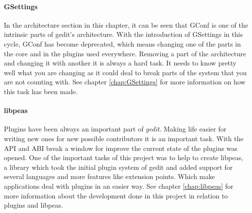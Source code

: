 \paragraph{GSettings}

In the architecture section in this chapter, it can be seen that GConf is one 
of the intrinsic parts of gedit's architecture. With the introduction of GSettings 
in this cycle, GConf has become deprecated, which means changing one of the parts 
in the core and in the plugins used everywhere. Removing a part of the architecture 
and changing it with another it is always a hard task. It needs to know pretty well 
what you are changing as it could deal to break parts of the system that you are not 
counting with. See chapter \ref{chap:GSettings} for more information on how this 
task has been made.

\paragraph{libpeas}

Plugins have been always an important part of \emph{gedit}. Making life easier 
for writing new ones for new possible contributors it is an important task. With 
the API and ABI break a window for improve the current state of the plugins was 
opened. One of the important tasks of this project was to help to create libpeas, 
a library which took the initial plugin system of gedit and added support for 
several languages and more features like extension points. Which make applications 
deal with plugins in an easier way. See chapter \ref{chap:libpeas} for more information 
about the development done in this project in relation to plugins and libpeas.


